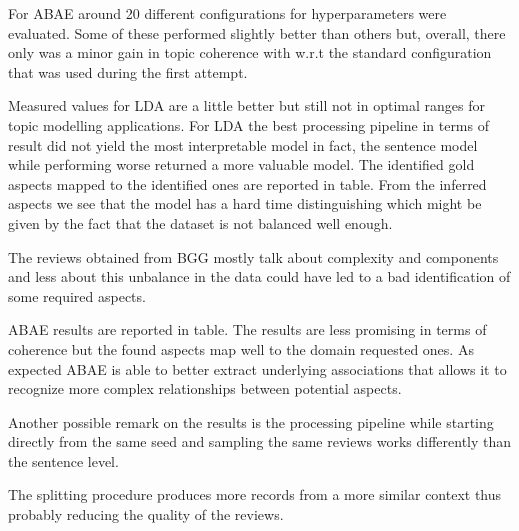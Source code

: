 For ABAE around 20 different configurations for hyperparameters were evaluated.
Some of these performed slightly better than others but, overall, there only was a minor gain in topic coherence with
w.r.t the standard configuration that was used during the first attempt.

Measured values for LDA are a little better but still not in optimal ranges for topic modelling applications.
For LDA the best processing pipeline in terms of result did not yield the most interpretable model in fact,
the sentence model while performing worse returned a more valuable model.
The identified gold aspects mapped to the identified ones are reported in table. %
From the inferred aspects we see that the model has a hard time distinguishing %
which might be given by the fact that the dataset is not balanced well enough.

The reviews obtained from BGG mostly talk about complexity and components and less about %
this unbalance in the data could have led to a bad identification of some required aspects.

ABAE results are reported in table.
The results are less promising in terms of coherence but the found aspects map well to the domain requested
ones.
As expected ABAE is able to better extract underlying associations that allows it to recognize more complex relationships
between potential aspects.

Another possible remark on the results is the processing pipeline while starting directly from the same
seed and sampling the same reviews works differently than the sentence level.

The splitting procedure produces more records from a more similar context thus probably reducing the
quality of the reviews.
